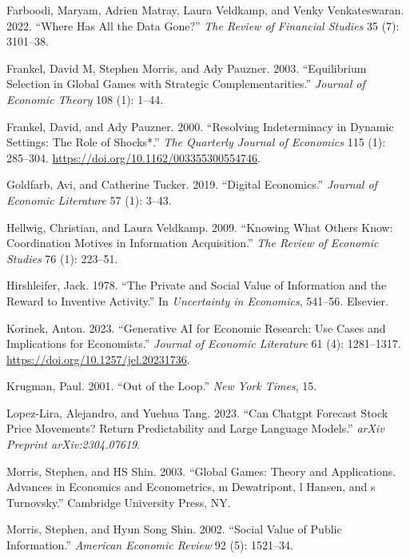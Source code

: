 \documentclass[
]{article}
\newlength{\cslhangindent}
\newenvironment{CSLReferences}[2] %
 {\begin{list}{}{%
  \setlength{\itemindent}{0pt}
  \setlength{\leftmargin}{0pt}
  \setlength{\parsep}{0pt}
  \ifodd #1
   \setlength{\leftmargin}{\cslhangindent}
   \setlength{\itemindent}{-1\cslhangindent}
  \fi
  \setlength{\itemsep}{#2\baselineskip}}}
 {\end{list}}
\theoremstyle{plain}
\theoremstyle{remark}
\begin{document}
\begin{CSLReferences}{1}{0}
Farboodi, Maryam, Adrien Matray, Laura Veldkamp, and Venky
Venkateswaran. 2022. {``Where Has All the Data Gone?''} \emph{The Review
of Financial Studies} 35 (7): 3101--38.

Frankel, David M, Stephen Morris, and Ady Pauzner. 2003. {``Equilibrium
Selection in Global Games with Strategic Complementarities.''}
\emph{Journal of Economic Theory} 108 (1): 1--44.

Frankel, David, and Ady Pauzner. 2000. {``{Resolving Indeterminacy in
Dynamic Settings: The Role of Shocks*}.''} \emph{The Quarterly Journal
of Economics} 115 (1): 285--304.
\url{https://doi.org/10.1162/003355300554746}.

Goldfarb, Avi, and Catherine Tucker. 2019. {``Digital Economics.''}
\emph{Journal of Economic Literature} 57 (1): 3--43.

Hellwig, Christian, and Laura Veldkamp. 2009. {``Knowing What Others
Know: Coordination Motives in Information Acquisition.''} \emph{The
Review of Economic Studies} 76 (1): 223--51.

Hirshleifer, Jack. 1978. {``The Private and Social Value of Information
and the Reward to Inventive Activity.''} In \emph{Uncertainty in
Economics}, 541--56. Elsevier.

Korinek, Anton. 2023. {``Generative AI for Economic Research: Use Cases
and Implications for Economists.''} \emph{Journal of Economic
Literature} 61 (4): 1281--1317.
\url{https://doi.org/10.1257/jel.20231736}.

Krugman, Paul. 2001. {``Out of the Loop.''} \emph{New York Times}, 15.

Lopez-Lira, Alejandro, and Yuehua Tang. 2023. {``Can Chatgpt Forecast
Stock Price Movements? Return Predictability and Large Language
Models.''} \emph{arXiv Preprint arXiv:2304.07619}.

Morris, Stephen, and HS Shin. 2003. {``Global Games: Theory and
Applications. Advances in Economics and Econometrics, m Dewatripont, l
Hansen, and s Turnovsky.''} Cambridge University Press, NY.

Morris, Stephen, and Hyun Song Shin. 2002. {``Social Value of Public
Information.''} \emph{American Economic Review} 92 (5): 1521--34.


\end{CSLReferences}
\end{document}
